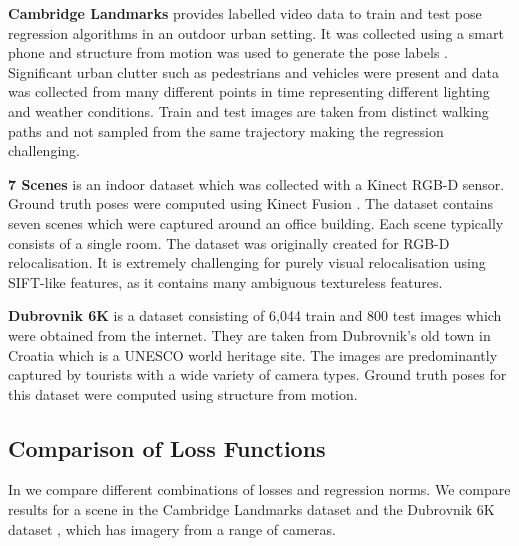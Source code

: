 \textbf{Cambridge Landmarks} \citep{kendall2015posenet} provides labelled video data to train and test pose regression algorithms in an outdoor urban setting. It was collected using a smart phone and structure from motion was used to generate the pose labels \citep{wu2013towards}. Significant urban clutter such as pedestrians and vehicles were present and data was collected from many different points in time representing different lighting and weather conditions. Train and test images are taken from distinct walking paths and not sampled from the same trajectory making the regression challenging.

\textbf{7 Scenes} \citep{shotton2013scene} is an indoor dataset which was collected with a Kinect RGB-D sensor. Ground truth poses were computed using Kinect Fusion \citep{shotton2013scene}. The dataset contains seven scenes which were captured around an office building. Each scene typically consists of a single room. The dataset was originally created for RGB-D relocalisation. It is extremely challenging for purely visual relocalisation using SIFT-like features, as it contains many ambiguous textureless features.

\textbf{Dubrovnik 6K} \citep{li2012worldwide} is a dataset consisting of 6,044 train and 800 test images which were obtained from the internet. They are taken from Dubrovnik's old town in Croatia which is a UNESCO world heritage site. The images are predominantly captured by tourists with a wide variety of camera types. Ground truth poses for this dataset were computed using structure from motion.

\subsection{Comparison of Loss Functions}
\label{sec:loss_exp}

In  we compare different combinations of losses and regression norms. We compare results for a scene in the Cambridge Landmarks dataset \citep{kendall2015posenet} and the Dubrovnik 6K dataset \citep{li2012worldwide}, which has imagery from a range of cameras.

